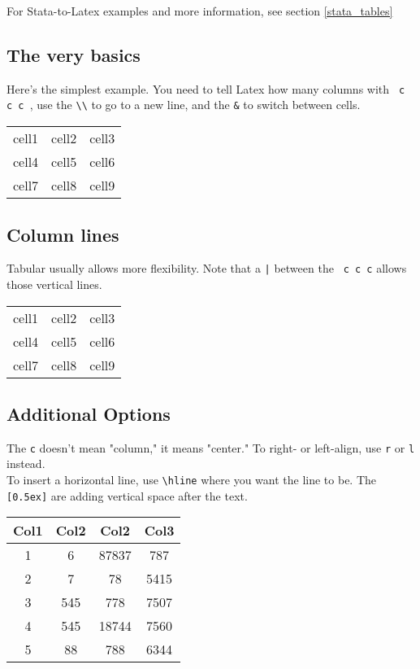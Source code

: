 For Stata-to-Latex examples and more information, see section \ref{stata_tables}

\subsection{The very basics}

Here's the simplest example. You need to tell Latex how many columns with \verb+ c c c +, use the \verb+\\+ to go to a new line, and the \verb+&+ to switch between cells. 

\begin{center}
	\begin{tabular}{ c c c }
		cell1 & cell2 & cell3 \\ 
		cell4 & cell5 & cell6 \\  
		cell7 & cell8 & cell9    
	\end{tabular}
\end{center}


\subsection{Column lines}

Tabular usually allows more flexibility. Note that a \verb+|+ between the \verb+ c c c+ allows those vertical lines.

\begin{center}
	\begin{tabular}{ |c|c|c| } 
		\hline
		cell1 & cell2 & cell3 \\ 
		cell4 & cell5 & cell6 \\ 
		cell7 & cell8 & cell9 \\ 
		\hline
	\end{tabular}
\end{center}

\subsection{Additional Options}
The \verb+c+ doesn't mean "column," it means "center." To right- or left-align, use \verb+r+ or \verb+l+ instead.\\

To insert a horizontal line, use \verb+\hline+ where you want the line to be. The \verb+[0.5ex]+ are adding vertical space after the text.

\begin{center}
	\begin{tabular}{||c c c c||} 
		\hline
		Col1 & Col2 & Col2 & Col3 \\ [0.5ex] 
		\hline\hline
		1 & 6 & 87837 & 787 \\ 
		\hline
		2 & 7 & 78 & 5415 \\
		\hline
		3 & 545 & 778 & 7507 \\
		\hline
		4 & 545 & 18744 & 7560 \\
		\hline
		5 & 88 & 788 & 6344 \\ [1ex] 
		\hline
	\end{tabular}
\end{center}


